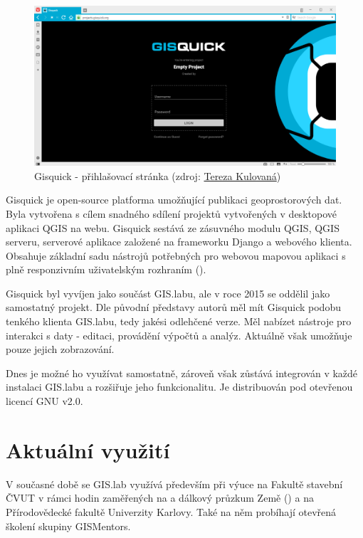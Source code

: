 \begin{figure}[H] \centering
    \includegraphics[width=400pt]{./pictures/gisquick-welcome-screen.png}
    \caption[Gisquick - přihlašovací stránka]{Gisquick - přihlašovací stránka (zdroj:
	\href{}{Tereza Kulovaná})}
    \label{fig:gisquick-welcome}
\end{figure}

Gisquick je open-source platforma umožňující publikaci geoprostorových
dat. Byla vytvořena s cílem snadného sdílení projektů vytvořených v
desktopové aplikaci QGIS na webu. Gisquick sestává ze zásuvného modulu
QGIS, QGIS serveru, serverové aplikace založené na frameworku Django a 
webového klienta. Obsahuje základní sadu nástrojů
potřebných pro webovou mapovou aplikaci s plně responzivním uživatelským
rozhraním ().

Gisquick byl vyvíjen jako součást GIS.labu, ale v roce 2015 se oddělil
jako samostatný projekt. Dle původní představy autorů měl mít Gisquick
podobu tenkého klienta GIS.labu, tedy jakési odlehčené verze. Měl 
nabízet nástroje pro interakci s daty - editaci, provádění výpočtů a analýz.
Aktuálně však umožňuje pouze jejich zobrazování. 

Dnes je možné ho využívat samostatně, zároveň však zůstává integrován 
v každé instalaci GIS.labu a rozšiřuje jeho funkcionalitu. Je distribuován 
pod otevřenou licencí GNU  v2.0.

\section{Aktuální využití}
\label{gislab-vyuziti}

V současné době se GIS.lab využívá především při výuce na Fakultě
stavební ČVUT v rámci hodin zaměřených na  a dálkový průzkum
Země () a na Přírodovědecké fakultě Univerzity Karlovy. Také
na něm probíhají otevřená školení skupiny GISMentors.

